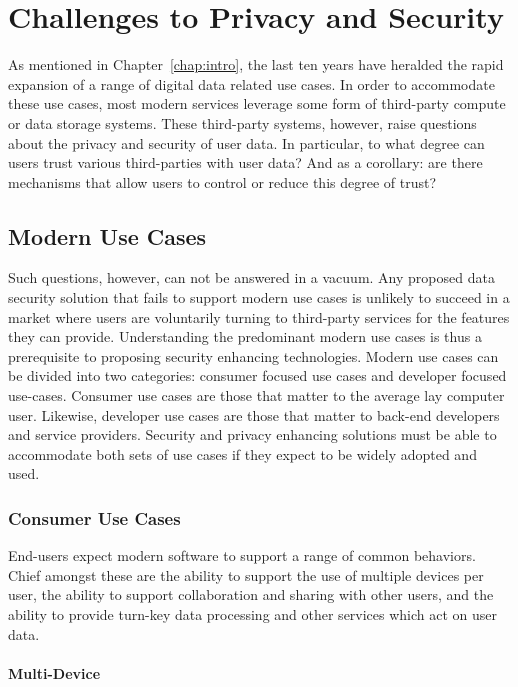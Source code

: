 \chapter{Challenges to Privacy and Security}
\label{chap:challenges}

As mentioned in Chapter~\ref{chap:intro}, the last ten years have
heralded the rapid expansion of a range of digital data related use
cases. In order to accommodate these use cases, most modern services
leverage some form of third-party compute or data storage
systems. These third-party systems, however, raise questions about the
privacy and security of user data. In particular, to what degree can
users trust various third-parties with user data? And as a corollary:
are there mechanisms that allow users to control or reduce this degree
of trust?

\section{Modern Use Cases}
\label{chap:challenges:usecases}

Such questions, however, can not be answered in a vacuum. Any proposed
data security solution that fails to support modern use cases is
unlikely to succeed in a market where users are voluntarily turning to
third-party services for the features they can provide. Understanding
the predominant modern use cases is thus a prerequisite to proposing
security enhancing technologies. Modern use cases can be divided into
two categories: consumer focused use cases and developer focused
use-cases. Consumer use cases are those that matter to the average lay
computer user. Likewise, developer use cases are those that matter to
back-end developers and service providers. Security and privacy
enhancing solutions must be able to accommodate both sets of use cases
if they expect to be widely adopted and used.

\subsection{Consumer Use Cases}

End-users expect modern software to support a range of common
behaviors. Chief amongst these are the ability to support the use of
multiple devices per user, the ability to support collaboration and
sharing with other users, and the ability to provide turn-key data
processing and other services which act on user data.

\subsubsection{Multi-Device}

